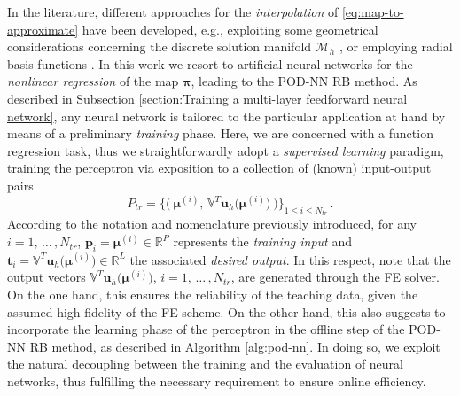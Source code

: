 \documentclass[longtitle]{elsarticle}
\numberwithin{equation}{section}
\theoremstyle{theorem}
\theoremstyle{definition}
\theoremstyle{remark}
\theoremstyle{proposition}
\numberwithin{figure}{section}
\newcommand{\bg}[1]{\boldsymbol{#1}}
\begin{document}
		In the literature, different approaches for the \emph{interpolation} of \eqref{eq:map-to-approximate} have been developed, e.g., exploiting some geometrical considerations concerning the discrete solution manifold $\mathcal{M}_h$ \cite{Ams10}, or employing radial basis functions \cite{Chen17}. In this work we resort to artificial neural networks for the \emph{nonlinear regression} of the map $\bg{\pi}$, leading to the POD-NN RB method. As described in Subsection \ref{section:Training a multi-layer feedforward neural network}, any neural network is tailored to the particular application at hand by means of a preliminary \emph{training} phase. Here, we are concerned with a function regression task, thus we straightforwardly adopt a \emph{supervised learning} paradigm, training the perceptron via exposition to a collection of (known) input-output pairs
		\begin{equation*}
			P_{tr} = \big\lbrace \big( ~ \bg{\mu}^{(i)}, \, \mathbb{V}^T \mathbf{u}_h \big( \bg{\mu}^{(i)} \big) ~ \big) \big\rbrace_{1 \leq i \leq N_{tr}} \, .
		\end{equation*}
		According to the notation and nomenclature previously introduced, for any $i = 1, \, \ldots \, , N_{tr}$, $\mathbf{p}_i = \bg{\mu}^{(i)} \in \mathbb{R}^P$ represents the \emph{training input} and $\mathbf{t}_i =  \mathbb{V}^T \mathbf{u}_h \big( \bg{\mu}^{(i)} \big) \in \mathbb{R}^L$ the associated \emph{desired output}. In this respect, note that the output vectors $\mathbb{V}^T \mathbf{u}_h \big( \bg{\mu}^{(i)} \big)$, $i = 1, \, \ldots \, , N_{tr}$, are generated through the FE solver. On the one hand, this ensures the reliability of the teaching data, given the assumed high-fidelity of the FE scheme.	On the other hand, this also suggests to incorporate the learning phase of the perceptron in the offline step of the POD-NN RB method, as described in Algorithm \ref{alg:pod-nn}. In doing so, we exploit the natural decoupling between the training and the evaluation of neural networks, thus fulfilling the necessary requirement to ensure online efficiency. 						

		\algrenewcommand\textproc{}
		
\end{document}

